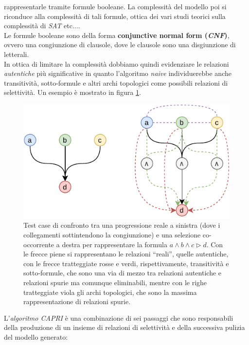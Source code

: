 \documentclass[a4paper,12pt, oneside]{book}
\begin{document}
rappresentarle tramite formule booleane. La complessità del modello poi si
riconduce alla complessità di tali formule, ottica dei vari studi teorici sulla
complessità di \textit{SAT} etc$\ldots$.\\
Le formule booleane sono della forma \textbf{conjunctive normal form
  (\textit{CNF})}, ovvero una congiunzione di clausole, dove le clausole sono
una disgiunzione di letterali.\\ 
In ottica di limitare la complessità dobbiamo quindi evidenziare le relazioni
\textit{autentiche} più significative in quanto l'algoritmo
\textit{naive} individuerebbe anche transitività, sotto-formule e altri archi
topologici come possibili relazioni di selettività. Un esempio è mostrato in
figura \ref{fig:gvss}.\\
\begin{figure}
  \centering
  \includegraphics[scale = 1.4]{img/gvss.pdf}
  \caption{Test case di confronto tra una progressione reale a sinistra (dove i
    collegamenti sottintendono la congiunzione) e una selezione 
    co-occorrente a destra per rappresentare la formula
    $a\land b\land c\triangleright d$. Con le frecce piene si rappresentano le
    relazioni ``reali'', quelle autentiche, con le frecce tratteggiate rosse
    e verdi, rispettivamente, transitività e sotto-formule, che sono una via di
    mezzo tra relazioni autentiche e relazioni spurie ma comunque eliminabili,
    mentre con le righe tratteggiate viola gli archi topologici, che sono la
    massima rappresentazione di relazioni spurie.} 
  \label{fig:gvss}
\end{figure}
L'\textit{algoritmo CAPRI} è una combinazione di sei passaggi che sono
responsabili della produzione di un insieme di relazioni di selettività e della
successiva pulizia del modello generato:
\end{document}
